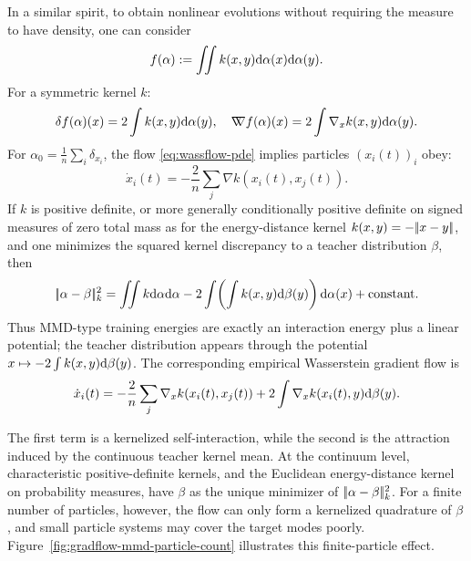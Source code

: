 In a similar spirit, to obtain nonlinear evolutions without requiring the measure to have density, one can consider
   \begin{equation}
       f(\alpha) := \iint k(x, y) \mathrm{d} \alpha(x) \mathrm{d} \alpha(y). \label{eq:quadratic-func}
   \end{equation}
   For a symmetric kernel $k$:
   \begin{equation*}
       \delta f(\alpha)(x) = 2 \int k(x, y) \mathrm{d} \alpha(y), \quad \mathord{\nabla\mkern-9.3mu\nabla} f(\alpha)(x) = 2 \int \nabla_x k(x, y) \mathrm{d} \alpha(y).
   \end{equation*}
   For $\alpha_0 = \frac{1}{n} \sum_i \delta_{x_i}$, the flow \eqref{eq:wassflow-pde} implies particles $(x_i(t))_i$ obey:
   \begin{equation*}
       \dot{x}_i(t) = -\frac{2}{n} \sum_j \nabla k(x_i(t), x_j(t)).
   \end{equation*}
	   If $k$ is positive definite, or more generally conditionally positive definite on signed measures of zero total mass as for the energy-distance kernel $k(x,y)=-|\!| x-y |\!|$, and one minimizes the squared kernel discrepancy to a teacher distribution $\beta$, then
   \[
       |\!| \alpha-\beta |\!|_k^2
       =
       \iint k\mathrm{d}\alpha\mathrm{d}\alpha
       -2\int\!\left(\int k(x,y)\mathrm{d}\beta(y)\right)\mathrm{d}\alpha(x)
       +\mathrm{constant}.
       \]
	       Thus MMD-type training energies are exactly an interaction energy plus a linear potential; the teacher distribution appears through the potential $x\mapsto-2\int k(x,y)\mathrm{d}\beta(y)$. The corresponding empirical Wasserstein gradient flow is
       \[
		\dot x_i(t)
		=
		-\frac{2}{n}\sum_j\nabla_x k(x_i(t),x_j(t))
		+
		2\int\nabla_x k(x_i(t),y)\mathrm{d}\beta(y).
       \]



	       The first term is a kernelized self-interaction, while the second is the attraction induced by the continuous teacher kernel mean. At the continuum level, characteristic positive-definite kernels, and the Euclidean energy-distance kernel on probability measures, have $\beta$ as the unique minimizer of $|\!| \alpha-\beta |\!|_k^2$. For a finite number of particles, however, the flow can only form a kernelized quadrature of $\beta$, and small particle systems may cover the target modes poorly. Figure~\ref{fig:gradflow-mmd-particle-count} illustrates this finite-particle effect.


